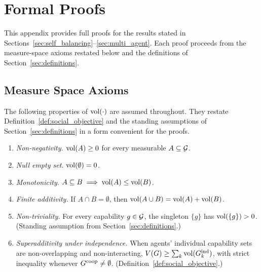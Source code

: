 %

\section{Formal Proofs}
\label{app:proofs}

This appendix provides full proofs for the results stated in
Sections~\ref{sec:self_balancing}--\ref{sec:multi_agent}. Each proof proceeds
from the measure-space axioms restated below and the definitions of
Section~\ref{sec:definitions}.


\subsection{Measure Space Axioms}
\label{app:axioms}

The following properties of $\operatorname{vol}(\cdot)$ are assumed throughout. They
restate Definition~\ref{def:social_objective} and the standing assumptions of
Section~\ref{sec:definitions} in a form convenient for the proofs.

\begin{enumerate}
\item[\textbf{(M1)}] \emph{Non-negativity.} $\operatorname{vol}(A) \geq 0$ for every measurable $A \subseteq \mathcal{G}$.
\item[\textbf{(M2)}] \emph{Null empty set.} $\operatorname{vol}(\emptyset) = 0$.
\item[\textbf{(M3)}] \emph{Monotonicity.} $A \subseteq B \implies \operatorname{vol}(A) \leq \operatorname{vol}(B)$.
\item[\textbf{(M4)}] \emph{Finite additivity.} If $A \cap B = \emptyset$, then $\operatorname{vol}(A \cup B) = \operatorname{vol}(A) + \operatorname{vol}(B)$.
\item[\textbf{(M5)}] \emph{Non-triviality.} For every capability $g \in \mathcal{G}$, the singleton $\{g\}$ has $\operatorname{vol}(\{g\}) > 0$. (Standing assumption from Section~\ref{sec:definitions}.)
\item[\textbf{(M6)}] \emph{Superadditivity under independence.} When agents' individual capability sets are non-overlapping and non-interacting, $V(G) \geq \sum_k \operatorname{vol}(G_{k}^{\mathrm{ind}})$, with strict inequality whenever $G^{\mathrm{coop}} \neq \emptyset$. (Definition~\ref{def:social_objective}.)
\end{enumerate}

